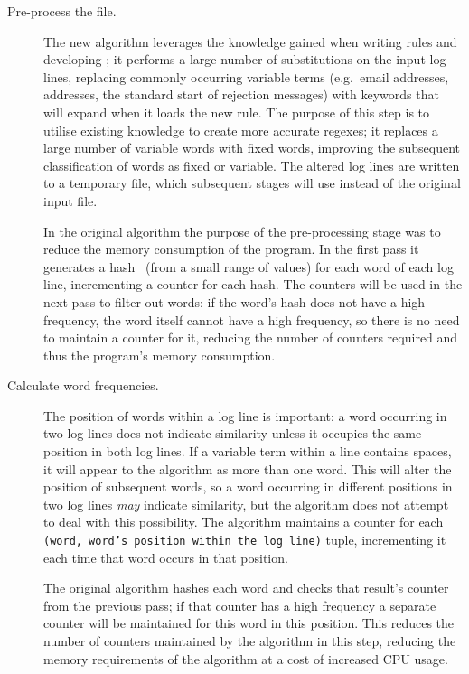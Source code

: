 \begin{description}

    \item [Pre-process the file.]  The new algorithm leverages the
        knowledge gained when writing rules and developing \parsername{};
        it performs a large number of substitutions on the input log lines,
        replacing commonly occurring variable terms (e.g.\ email addresses,
         addresses, the standard start of rejection messages)
        with keywords that \parsername{} will expand when it loads the new
        rule.  The purpose of this step is to utilise existing knowledge to
        create more accurate regexes; it replaces a large number of
        variable words with fixed words, improving the subsequent
        classification of words as fixed or variable.  The altered log
        lines are written to a temporary file, which subsequent stages will
        use instead of the original input file.

        In the original algorithm the purpose of the pre-processing stage
        was to reduce the memory consumption of the program.  In the first
        pass it generates a hash~\cite{hash-functions} (from a
        small range of values) for each word of each log line, incrementing
        a counter for each hash.  The counters will be used in the next
        pass to filter out words: if the word's hash does not have a high
        frequency, the word itself cannot have a high frequency, so there
        is no need to maintain a counter for it, reducing the number of
        counters required and thus the program's memory consumption.

    \item [Calculate word frequencies.]  The position of words within a log
        line is important: a word occurring in two log lines does not
        indicate similarity unless it occupies the same position in both
        log lines.  If a variable term within a line contains
        spaces, it will appear to the algorithm as more than one word.
        This will alter the position of subsequent words, so a word
        occurring in different positions in two log lines \textit{may\/}
        indicate similarity, but the algorithm does not attempt to deal
        with this possibility.  The algorithm maintains a counter for each
        \texttt{(word, word's position within the log line)} tuple,
        incrementing it each time that word occurs in that position.

        The original algorithm hashes each word and checks that result's
        counter from the previous pass; if that counter has a high
        frequency a separate counter will be maintained for this word in
        this position.  This reduces the number of counters maintained by
        the algorithm in this step, reducing the memory requirements of the
        algorithm at a cost of increased CPU usage.


\end{description}
